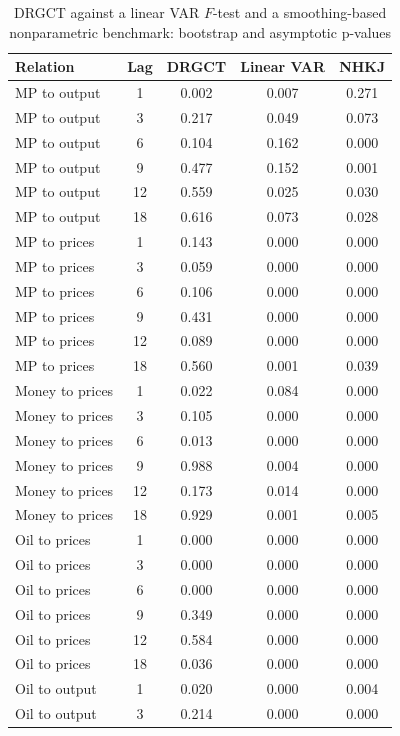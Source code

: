 \begin{table}[htbp]
\centering
\caption{DRGCT against a linear VAR $F$-test and a smoothing-based nonparametric benchmark: bootstrap and asymptotic p-values}
\label{tab:macrocomp}
\small
\begin{tabular}{lcccc}
\toprule
Relation & Lag & DRGCT & Linear VAR & NHKJ \\
\midrule
MP to output & 1 & 0.002 & 0.007 & 0.271 \\
MP to output & 3 & 0.217 & 0.049 & 0.073 \\
MP to output & 6 & 0.104 & 0.162 & 0.000 \\
MP to output & 9 & 0.477 & 0.152 & 0.001 \\
MP to output & 12 & 0.559 & 0.025 & 0.030 \\
MP to output & 18 & 0.616 & 0.073 & 0.028 \\
MP to prices & 1 & 0.143 & 0.000 & 0.000 \\
MP to prices & 3 & 0.059 & 0.000 & 0.000 \\
MP to prices & 6 & 0.106 & 0.000 & 0.000 \\
MP to prices & 9 & 0.431 & 0.000 & 0.000 \\
MP to prices & 12 & 0.089 & 0.000 & 0.000 \\
MP to prices & 18 & 0.560 & 0.001 & 0.039 \\
Money to prices & 1 & 0.022 & 0.084 & 0.000 \\
Money to prices & 3 & 0.105 & 0.000 & 0.000 \\
Money to prices & 6 & 0.013 & 0.000 & 0.000 \\
Money to prices & 9 & 0.988 & 0.004 & 0.000 \\
Money to prices & 12 & 0.173 & 0.014 & 0.000 \\
Money to prices & 18 & 0.929 & 0.001 & 0.005 \\
Oil to prices & 1 & 0.000 & 0.000 & 0.000 \\
Oil to prices & 3 & 0.000 & 0.000 & 0.000 \\
Oil to prices & 6 & 0.000 & 0.000 & 0.000 \\
Oil to prices & 9 & 0.349 & 0.000 & 0.000 \\
Oil to prices & 12 & 0.584 & 0.000 & 0.000 \\
Oil to prices & 18 & 0.036 & 0.000 & 0.000 \\
Oil to output & 1 & 0.020 & 0.000 & 0.004 \\
Oil to output & 3 & 0.214 & 0.000 & 0.000 \\

\end{tabular}
\end{table}
